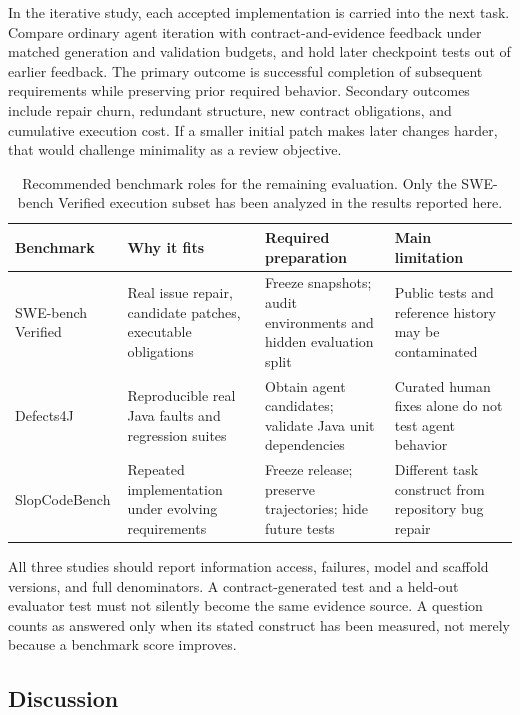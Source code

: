 \documentclass[a4paper,fleqn]{cas-sc}
\begin{document}
In the iterative study, each accepted implementation is carried into the next task. Compare ordinary agent iteration with contract-and-evidence feedback under matched generation and validation budgets, and hold later checkpoint tests out of earlier feedback. The primary outcome is successful completion of subsequent requirements while preserving prior required behavior. Secondary outcomes include repair churn, redundant structure, new contract obligations, and cumulative execution cost. If a smaller initial patch makes later changes harder, that would challenge minimality as a review objective.

\begin{table}[pos=htbp]
\caption{Recommended benchmark roles for the remaining evaluation. Only the SWE-bench Verified execution subset has been analyzed in the results reported here.}
\label{tab:benchmarks}
\centering\small
\begin{tabularx}{\linewidth}{lXXX}
\toprule
Benchmark & Why it fits & Required preparation & Main limitation \\
\midrule
SWE-bench Verified & Real issue repair, candidate patches, executable obligations & Freeze snapshots; audit environments and hidden evaluation split & Public tests and reference history may be contaminated \\
Defects4J & Reproducible real Java faults and regression suites & Obtain agent candidates; validate Java unit dependencies & Curated human fixes alone do not test agent behavior \\
SlopCodeBench & Repeated implementation under evolving requirements & Freeze release; preserve trajectories; hide future tests & Different task construct from repository bug repair \\
\bottomrule
\end{tabularx}
\end{table}

All three studies should report information access, failures, model and scaffold versions, and full denominators. A contract-generated test and a held-out evaluator test must not silently become the same evidence source. A question counts as answered only when its stated construct has been measured, not merely because a benchmark score improves.

\subsection{Discussion}\label{sec:discussion}
\end{document}
